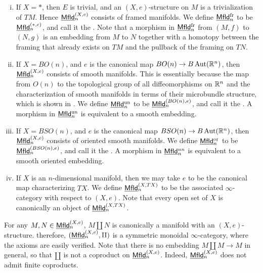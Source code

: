 \documentclass[twoside]{article}
\begin{document}
\begin{example}
    \begin{enumerate}[i)]
        \item If $X=*$, then $E$ is trivial, and an $(X,e)$-structure on $M$ is
        a trivialization of $TM$. Hence $\underline{\smash{\mathsf{Mfld}}}_n^{(X,e)}$ consists of framed manifolds.
        We define $\underline{\smash{\mathsf{Mfld}}}_n^{\mathrm{fr}}$ to be $\underline{\smash{\mathsf{Mfld}}}_n^{(*,e)}$, and call it the 
        . Note that
        a morphism in $\underline{\smash{\mathsf{Mfld}}}_n^{\mathrm{fr}}$ from $(M,f)$ to $(N,g)$ is an embedding from $M$
        to $N$ together with a homotopy between the framing that already exists on 
        $TM$ and the pullback of the framing on $TN$.

        \item If $X=BO(n)$, and $e$ is the canonical map $BO(n)\to B\operatorname{Aut}(\mathbb{R}^n)$,
        then $\underline{\smash{\mathsf{Mfld}}}_n^{(X,e)}$ consists of smooth manifolds. This is essentially because
        the map from $O(n)$ to the topological group of all diffeomorphisms on $\mathbb{R}^n$ and the characterization
        of smooth manifolds in terms of their microbundle structure, which is shown in
        \cite{KS77}. We define $\underline{\smash{\mathsf{Mfld}}}_n^{\mathrm{un}}$ to be $\underline{\smash{\mathsf{Mfld}}}_n^{(BO(n),e)}$,
        and call it the .
        A morphism in $\underline{\smash{\mathsf{Mfld}}}_n^{\mathrm{un}}$ is equivalent to a smooth embedding.

        \item If $X=BSO(n)$, and $e$ is the canonical map $BSO(n)\to B\operatorname{Aut}(\mathbb{R}^n)$,
        then $\underline{\smash{\mathsf{Mfld}}}_n^{(X,e)}$ consists of oriented smooth manifolds. We define
        $\underline{\smash{\mathsf{Mfld}}}_n^{\mathrm{or}}$ to be $\underline{\smash{\mathsf{Mfld}}}_n^{(BSO(n),e)}$, and call it the 
        .
        A morphism in $\underline{\smash{\mathsf{Mfld}}}_n^{un}$ is equivalent to a smooth oriented embedding.

        \item If $X$ is an $n$-dimensional manifold, then we may take $e$ to be the
        canonical map characterizing $TX$. We define $\underline{\smash{\mathsf{Mfld}}}_n^{(X,TX)}$ to be the
        associated $\infty$-category with respect to $(X,e)$. Note that every open set
        of $X$ is canonically an object of $\underline{\smash{\mathsf{Mfld}}}_n^{(X,TX)}$.
    \end{enumerate}
\end{example}

For any $M,N\in\underline{\smash{\mathsf{Mfld}}}_n^{(X,e)}$, $M\amalg N$ is canonically a manifold with
an $(X,e)$-structure. therefore, $(\underline{\smash{\mathsf{Mfld}}}_n^{(X,e)},\amalg)$
is a symmetric monoidal $\infty$-category, where the axioms are easily
verified. Note that there is no embedding $M\amalg M\to M$ in general, 
so that $\amalg$ is not a coproduct on $\underline{\smash{\mathsf{Mfld}}}_n^{(X,e)}$. Indeed, 
$\underline{\smash{\mathsf{Mfld}}}_n^{(X,e)}$ does not admit finite coproducts.
\end{document}

